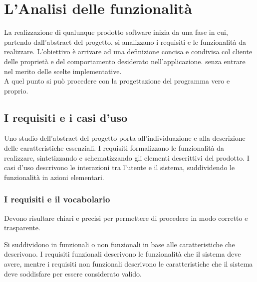 \section{L'Analisi delle funzionalità}

La realizzazione di qualunque prodotto software inizia da una fase in cui, partendo dall’abstract del progetto,  si analizzano i requisiti e le funzionalità da realizzare.
L’obiettivo è arrivare ad una definizione concisa e condivisa col cliente delle proprietà e del comportamento desiderato nell’applicazione.
senza entrare nel merito delle scelte implementative.\\
A quel punto si può procedere con la progettazione del programma vero e proprio.

\vspace{50mm}

\subsection{I requisiti e i casi d’uso}

Uno studio dell’abstract del progetto porta all’individuazione e alla descrizione delle caratteristiche essenziali.
I requisiti formalizzano le funzionalità da realizzare, sintetizzando e schematizzando gli elementi descrittivi del prodotto.
I casi d'uso descrivono le interazioni tra l'utente e il sistema, suddividendo le funzionalità in azioni elementari.\\
\clearpage
\subsubsection{I requisiti e il vocabolario}
Devono risultare chiari e precisi per permettere di procedere in modo corretto e trasparente.

Si suddividono in funzionali o non funzionali in base alle caratteristiche che descrivono.
I requisiti funzionali descrivono le funzionalità che il sistema deve avere,
mentre i requisiti non funzionali descrivono le caratteristiche che il sistema deve soddisfare per essere considerato valido.\\

